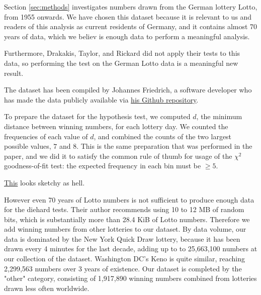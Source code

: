 Section \ref{sec:methods} investigates numbers drawn from the German lottery Lotto, from 1955 onwards. 
We have chosen this dataset because it is relevant to us and readers of this analysis as current residents of Germany, 
and it contains almost 70 years of data, which we believ is enough data to perform a meaningful analysis.

Furthermore, Drakakis, Taylor, and Rickard did not apply their tests to this data, so 
performing the test on the German Lotto data is a meaningful new result.

The dataset has been compiled by Johannes Friedrich, 
a software developer who has made the data publicly available via 
\href{https://github.com/JohannesFriedrich/LottoNumberArchive}{his Github repository}.



To prepare the dataset for the hypothesis test, we computed $d$, the minimum distance between winning numbers, for each 
lottery day. We counted the frequencies of each value of $d$, and combined the counts of the 
two largest possible values, $7$ and $8$. This is the same preparation that was performed in the paper,
and we did it to satisfy the common rule of thumb for usage of the 
$\chi^2$ goodness-of-fit test: the expected frequency in each bin must be $\geq 5$.

 \href{https://notebook.community/JesseScott/Lotto649/lotto}{This} looks sketchy as hell.

However even 70 years of Lotto numbers is not sufficient to produce enough data for the diehard tests. Their author recommends
using 10 to 12 MB of random bits, which is substantially more than 28.4 KiB of Lotto numbers. Therefore we add winning numbers
from other lotteries to our dataset. By data volume, our data is dominated by the New York Quick Draw lottery, because it has
been drawn every 4 minutes for the last decade, adding up to to 25,663,100 numbers at our collection of the dataset.
Washington DC's Keno is quite similar, reaching 2,299,563 numbers over 3 years of existence. Our dataset is completed by
the "other" category, consisting of 1,917,890 winning numbers combined from lotteries drawn less often worldwide.


